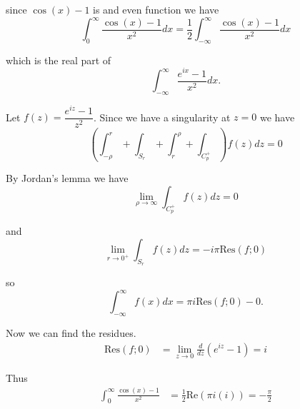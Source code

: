 \documentclass[12pt]{article}
\begin{document}
since $\cos(x) - 1$ is and even function we have
\[
	\int_{0}^{\infty} \frac{\cos(x) - 1}{x^2}dx = \frac{1}{2}\int_{-\infty}^{\infty} \frac{\cos(x) - 1}{x^2}dx
\]

which is the real part of
\[
	\int_{-\infty}^{\infty} \frac{e^{ix} - 1}{x^2}dx.
\]

Let $f(z) = \dfrac{e^{iz} - 1}{z^2}$. Since we have a singularity at $z = 0$ we have
\[
	\left(\int_{-\rho}^{r} + \int_{S_r} + \int_{r}^{\rho} + \int_{C_p^{+}}\right)f(z)dz = 0
\]

By Jordan's lemma we have
\[
	\lim_{\rho \to \infty}\int_{C_p^{+}}f(z)dz = 0
\]

and
\[
	\lim_{r \to 0^{+}}\int_{S_r}f(z)dz = -i\pi \text{Res}(f; 0)
\]

so
\[
	\int_{-\infty}^{\infty} f(x)dx = \pi i \text{Res}(f; 0) - 0.
\]

Now we can find the residues.
\begin{align*}
	\text{Res}(f; 0) &= \lim_{z \to 0} \frac{d}{dz}(e^{iz} - 1) = i
\end{align*}

Thus
\begin{align*}
	\int_{0}^{\infty} \frac{\cos(x) - 1}{x^2} &= \frac{1}{2}\text{Re}\left(\pi i (i)\right) = -\frac{\pi}{2}
\end{align*}
\end{document}
